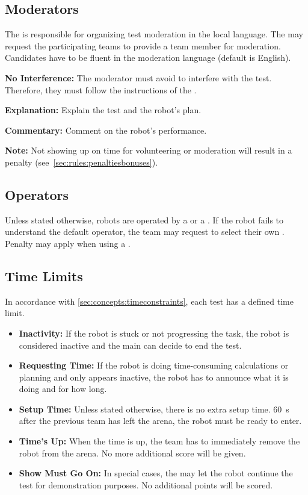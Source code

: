 \subsection{Moderators}
\label{sec:rules:moderators}
The  is responsible for organizing test moderation in the local language. The  may request the participating teams to provide a team member for moderation. Candidates have to be fluent in the moderation language (default is English).
\begin{compactitem}
	\item \textbf{No Interference:} The moderator must avoid to interfere with the test. Therefore, they must follow the instructions of the \Referees{}.
	\item \textbf{Explanation:} Explain the test and the robot's plan.
	\item \textbf{Commentary:} Comment on the robot's performance.
\end{compactitem}

\noindent \textbf{Note:} Not showing up on time for volunteering or moderation will result in a penalty (see~\ref{sec:rules:penaltiesbonuses}).

\subsection{Operators}
\label{sec:rules:operators}
Unless stated otherwise, robots are operated by a \Referee{} or a \Volunteer{}. If the robot fails to understand the default operator, the team may request to select their own \CustomOperator{}. Penalty may apply when using a \CustomOperator{}.


\subsection{Time Limits}
\label{rule:time_limits}
In accordance with \ref{sec:concepts:timeconstraints}, each test has a defined time limit.
\begin{itemize}
	\item \textbf{Inactivity:} If the robot is stuck or not progressing the task, the robot is considered inactive and the main \Referee{} can decide to end the test.

	\item \textbf{Requesting Time:} If the robot is doing time-consuming calculations or planning and only appears inactive, the robot has to announce what it is doing and for how long.

	\item \textbf{Setup Time:} Unless stated otherwise, there is no extra setup time. \SI{60}{\second} after the previous team has left the arena, the robot must be ready to enter.

	\item \textbf{Time's Up:} When the time is up, the team has to immediately remove the robot from the arena.
	No more additional score will be given.

	\item \textbf{Show Must Go On:} In special cases, the \Referee{} may let the robot continue the test for demonstration purposes. No additional points will be scored.
\end{itemize}

